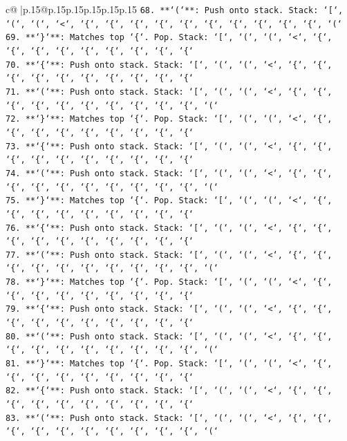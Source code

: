 \documentclass{article}
\begin{document}
{\begin{supertabular}{c@{$\;$}|p{.15\linewidth}@{}p{.15\linewidth}p{.15\linewidth}p{.15\linewidth}p{.15\linewidth}p{.15\linewidth}}
{{{\texttt{68. **`(`**: Push onto stack. Stack: `{[}`, `(`, `(`, `<`, `\{`, `\{`, `\{`, `\{`, `\{`, `\{`, `\{`, `\{`, `\{`, `\{`, `(`} \\
\texttt{69. **`\}`**: Matches top `\{`. Pop. Stack: `{[}`, `(`, `(`, `<`, `\{`, `\{`, `\{`, `\{`, `\{`, `\{`, `\{`, `\{`, `\{`} \\
\texttt{70. **`\{`**: Push onto stack. Stack: `{[}`, `(`, `(`, `<`, `\{`, `\{`, `\{`, `\{`, `\{`, `\{`, `\{`, `\{`, `\{`, `\{`} \\
\texttt{71. **`(`**: Push onto stack. Stack: `{[}`, `(`, `(`, `<`, `\{`, `\{`, `\{`, `\{`, `\{`, `\{`, `\{`, `\{`, `\{`, `\{`, `(`} \\
\texttt{72. **`\}`**: Matches top `\{`. Pop. Stack: `{[}`, `(`, `(`, `<`, `\{`, `\{`, `\{`, `\{`, `\{`, `\{`, `\{`, `\{`, `\{`} \\
\texttt{73. **`\{`**: Push onto stack. Stack: `{[}`, `(`, `(`, `<`, `\{`, `\{`, `\{`, `\{`, `\{`, `\{`, `\{`, `\{`, `\{`, `\{`} \\
\texttt{74. **`(`**: Push onto stack. Stack: `{[}`, `(`, `(`, `<`, `\{`, `\{`, `\{`, `\{`, `\{`, `\{`, `\{`, `\{`, `\{`, `\{`, `(`} \\
\texttt{75. **`\}`**: Matches top `\{`. Pop. Stack: `{[}`, `(`, `(`, `<`, `\{`, `\{`, `\{`, `\{`, `\{`, `\{`, `\{`, `\{`, `\{`} \\
\texttt{76. **`\{`**: Push onto stack. Stack: `{[}`, `(`, `(`, `<`, `\{`, `\{`, `\{`, `\{`, `\{`, `\{`, `\{`, `\{`, `\{`, `\{`} \\
\texttt{77. **`(`**: Push onto stack. Stack: `{[}`, `(`, `(`, `<`, `\{`, `\{`, `\{`, `\{`, `\{`, `\{`, `\{`, `\{`, `\{`, `\{`, `(`} \\
\texttt{78. **`\}`**: Matches top `\{`. Pop. Stack: `{[}`, `(`, `(`, `<`, `\{`, `\{`, `\{`, `\{`, `\{`, `\{`, `\{`, `\{`, `\{`} \\
\texttt{79. **`\{`**: Push onto stack. Stack: `{[}`, `(`, `(`, `<`, `\{`, `\{`, `\{`, `\{`, `\{`, `\{`, `\{`, `\{`, `\{`, `\{`} \\
\texttt{80. **`(`**: Push onto stack. Stack: `{[}`, `(`, `(`, `<`, `\{`, `\{`, `\{`, `\{`, `\{`, `\{`, `\{`, `\{`, `\{`, `\{`, `(`} \\
\texttt{81. **`\}`**: Matches top `\{`. Pop. Stack: `{[}`, `(`, `(`, `<`, `\{`, `\{`, `\{`, `\{`, `\{`, `\{`, `\{`, `\{`, `\{`} \\
\texttt{82. **`\{`**: Push onto stack. Stack: `{[}`, `(`, `(`, `<`, `\{`, `\{`, `\{`, `\{`, `\{`, `\{`, `\{`, `\{`, `\{`, `\{`} \\
\texttt{83. **`(`**: Push onto stack. Stack: `{[}`, `(`, `(`, `<`, `\{`, `\{`, `\{`, `\{`, `\{`, `\{`, `\{`, `\{`, `\{`, `\{`, `(`} \\
}}}
\end{supertabular}}
\end{document}
